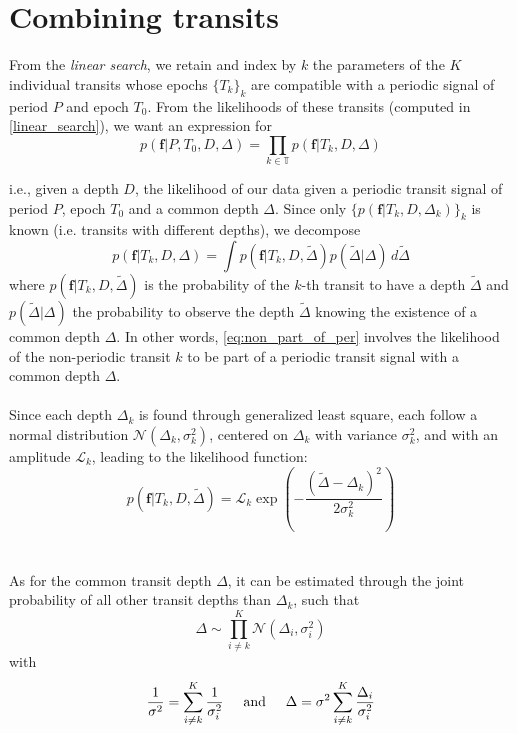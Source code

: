 \documentclass{aastex631}
\begin{document}
\newpage
\section{Combining transits}\label{combining_transits}

\newcommand{\sumTk}{i\neq k}
From the \textit{linear search}, we retain and index by $k$ the parameters of the $K$ individual transits whose epochs $\{T_k\}_k$ are compatible with a periodic signal of period $P$ and epoch $T_0$. From the likelihoods of these transits (computed in \autoref{linear_search}), we want an expression for
\begin{equation}\label{eq:goal2}
    p(\bm{f} \vert P, T_0 ,D, \Delta) = \prod_{k\in\mathbb{T}} p(\bm{f} \vert T_k, D, \Delta)
\end{equation}

i.e., given a depth $D$, the likelihood of our data given a periodic transit signal of period $P$, epoch $T_0$ and a common depth $\Delta$. Since only $\{p(\bm{f} \vert T_k, D, \Delta_k)\}_{k}$ is known (i.e. transits with different depths), we decompose
\begin{equation}\label{eq:non_part_of_per}
    p(\bm{f} \vert T_k, D, \Delta) = \int p(\bm{f} \vert T_k, D, \tilde\Delta)p(\tilde\Delta | \Delta)\, d\tilde\Delta
\end{equation}
where $p(\bm{f} \vert T_k, D, \tilde\Delta)$ is the probability of the $k$-th transit to have a depth $\tilde\Delta$ and $p(\tilde\Delta | \Delta)$ the probability to observe the depth $\tilde\Delta$ knowing the existence of a common depth $\Delta$. In other words, \autoref{eq:non_part_of_per} involves the likelihood of the non-periodic transit $k$ to be part of a periodic transit signal with a common depth $\Delta$.
\\\\
Since each depth $\Delta_k$ is found through generalized least square, each follow a normal distribution $\mathcal{N}(\Delta_k, \sigma_k^2)$, centered on $\Delta_k$ with variance $\sigma_k^2$, and with an amplitude $\mathcal{L}_k$, leading to the likelihood function:
$$p(\bm{f} \vert T_k, D, \tilde\Delta) = \mathcal{L}_k\exp \left(-\frac{(\tilde\Delta-\Delta_k)^2}{2\sigma_k^2}\right)$$
\\\\
As for the common transit depth $\Delta$, it can be estimated through the joint probability of all other transit depths than $\Delta_k$, such that
$$\Delta \sim \prod_{\sumTk}^K \mathcal{N}(\Delta_i, \sigma_i^2)$$
with 
\begin{equation}\label{eq:params}
\frac{1}{\sigma^2} = \sum_{\sumTk}^K \frac{1}{\sigma_i^2} \hspace{0.5cm} \text{and} \hspace{0.5cm}
\Delta =\sigma^2 \sum_{\sumTk}^K {\frac{\Delta_i}{\sigma_i^2}}
\end{equation}
\end{document}
